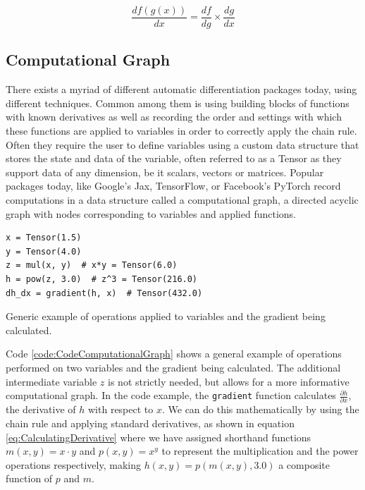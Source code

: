 \begin{equation}\label{eq:ChainRule}
    \frac{d f(g(x))}{dx} = \frac{d f}{dg} \times \frac{d g}{d x}
\end{equation}

\subsection{Computational Graph}\label{sec:ComputationalGraph}

There exists a myriad of different automatic differentiation packages today, using different techniques. Common among them is using building blocks of functions with known derivatives as well as recording the order and settings with which these functions are applied to variables in order to correctly apply the chain rule. Often they require the user to define variables using a custom data structure that stores the state and data of the variable, often referred to as a Tensor as they support data of any dimension, be it scalars, vectors or matrices. Popular packages today, like Google's Jax, TensorFlow, or Facebook's PyTorch record computations in a data structure called a computational graph, a directed acyclic graph with nodes corresponding to variables and applied functions.

\begin{codefig}
\begin{verbatim}
x = Tensor(1.5)
y = Tensor(4.0)
z = mul(x, y)  # x*y = Tensor(6.0)
h = pow(z, 3.0)  # z^3 = Tensor(216.0)
dh_dx = gradient(h, x)  # Tensor(432.0)
\end{verbatim}
    \caption{Generic example of operations applied to variables and the gradient being calculated.}
    \label{code:CodeComputationalGraph}
\end{codefig}

Code \ref{code:CodeComputationalGraph} shows a general example of operations performed on two variables and the gradient being calculated. The additional intermediate variable $z$ is not strictly needed, but allows for a more informative computational graph. In the code example, the \texttt{gradient} function calculates $\frac{\partial h}{\partial x}$, the derivative of $h$ with respect to $x$. We can do this mathematically by using the chain rule and applying standard derivatives, as shown in equation \ref{eq:CalculatingDerivative} where we have assigned shorthand functions $m(x,y)=x\cdot y$ and $p(x,y)=x^y$ to represent the multiplication and the power operations respectively, making $h(x,y)=p(m(x,y),3.0)$ a composite function of $p$ and $m$.

